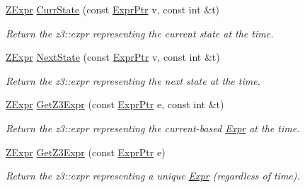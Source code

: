\begin{DoxyCompactItemize}
\mbox{\hyperlink{classilang_1_1_unroller_a9fd0359e3ffd666f8f92ad3c3ef52673}{Z\+Expr}} \mbox{\hyperlink{classilang_1_1_unroller_a4e96f5740ade5b06e715a5e19b21f049}{Curr\+State}} (const \mbox{\hyperlink{namespaceilang_a7c4196c72e53ea4df4b7861af7bc3bce}{Expr\+Ptr}} v, const int \&t)
\begin{DoxyCompactList}\small\item\em Return the z3\+::expr representing the current state at the time. \end{DoxyCompactList}\item 
\mbox{\label{classilang_1_1_unroller_acd07f4c35565bad61c642e9ec5c0ccd9}} 
\mbox{\hyperlink{classilang_1_1_unroller_a9fd0359e3ffd666f8f92ad3c3ef52673}{Z\+Expr}} \mbox{\hyperlink{classilang_1_1_unroller_acd07f4c35565bad61c642e9ec5c0ccd9}{Next\+State}} (const \mbox{\hyperlink{namespaceilang_a7c4196c72e53ea4df4b7861af7bc3bce}{Expr\+Ptr}} v, const int \&t)
\begin{DoxyCompactList}\small\item\em Return the z3\+::expr representing the next state at the time. \end{DoxyCompactList}\item 
\mbox{\label{classilang_1_1_unroller_ae31da98aeaeb4a202566f92b6e55f05f}} 
\mbox{\hyperlink{classilang_1_1_unroller_a9fd0359e3ffd666f8f92ad3c3ef52673}{Z\+Expr}} \mbox{\hyperlink{classilang_1_1_unroller_ae31da98aeaeb4a202566f92b6e55f05f}{Get\+Z3\+Expr}} (const \mbox{\hyperlink{namespaceilang_a7c4196c72e53ea4df4b7861af7bc3bce}{Expr\+Ptr}} e, const int \&t)
\begin{DoxyCompactList}\small\item\em Return the z3\+::expr representing the current-\/based \mbox{\hyperlink{classilang_1_1_expr}{Expr}} at the time. \end{DoxyCompactList}\item 
\mbox{\label{classilang_1_1_unroller_acd075512ceb6f2dd14c86b6950f7a6bb}} 
\mbox{\hyperlink{classilang_1_1_unroller_a9fd0359e3ffd666f8f92ad3c3ef52673}{Z\+Expr}} \mbox{\hyperlink{classilang_1_1_unroller_acd075512ceb6f2dd14c86b6950f7a6bb}{Get\+Z3\+Expr}} (const \mbox{\hyperlink{namespaceilang_a7c4196c72e53ea4df4b7861af7bc3bce}{Expr\+Ptr}} e)
\begin{DoxyCompactList}\small\item\em Return the z3\+::expr representing a unique \mbox{\hyperlink{classilang_1_1_expr}{Expr}} (regardless of time). \end{DoxyCompactList}\item 

\end{DoxyCompactItemize}
